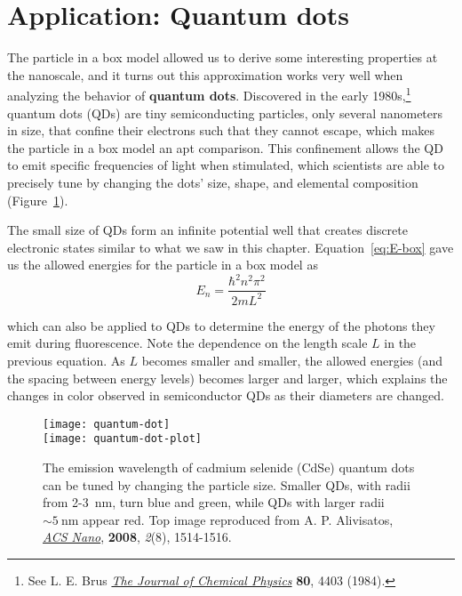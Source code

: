 
\section{Application: Quantum dots}
The particle in a box model allowed us to derive some interesting properties at the nanoscale, and it turns out this approximation works very well when analyzing the behavior of \textbf{quantum dots}. Discovered in the early 1980s,\footnote{See L. E. Brus \href{http://aip.scitation.org/doi/abs/10.1063/1.447218}{\emph{The Journal of Chemical Physics}} \textbf{80}, 4403 (1984).} quantum dots (QDs) are tiny semiconducting particles, only several nanometers in size, that confine their electrons such that they cannot escape, which makes the particle in a box model an apt comparison. This confinement allows the QD to emit specific frequencies of light when stimulated, which scientists are able to precisely tune by changing the dots' size, shape, and elemental composition (Figure~\ref{fig:qdot}). \par 

The small size of QDs form an infinite potential well that creates discrete electronic states similar to what we saw in this chapter. Equation~\ref{eq:E-box} gave us the allowed energies for the particle in a box model as
\begin{equation*}
	E_n = \frac{\hbar^2n^2\pi^2}{2mL^2}
\end{equation*}

which can also be applied to QDs to determine the energy of the photons they emit during fluorescence. Note the dependence on the length scale $L$ in the previous equation. As $L$ becomes smaller and smaller, the allowed energies (and the spacing between energy levels) becomes larger and larger, which explains the changes in color observed in semiconductor QDs as their diameters are changed.

\begin{figure}[!h]
	\centering
	\texttt{[image: quantum-dot]} \\
	\texttt{[image: quantum-dot-plot]}
	\caption{The emission wavelength of cadmium selenide (CdSe) quantum dots can be tuned by changing the particle size. Smaller QDs, with radii from 2-\SI{3}{\nano\meter}, turn blue and green, while QDs with larger radii $\sim\SI{5}{\nano\meter}$ appear red. Top image reproduced from A. P. Alivisatos, \href{http://pubs.acs.org/doi/abs/10.1021/nn800485f1}{\emph{ACS Nano}}, \textbf{2008}, \emph{2}(8), 1514-1516.}
	\label{fig:qdot}
\end{figure}

